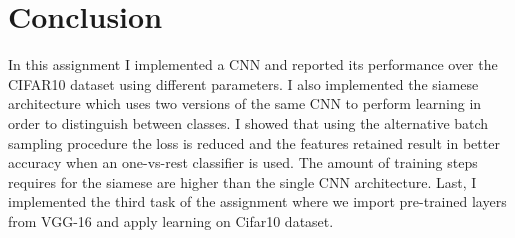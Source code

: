 \documentclass{article}
\begin{document}
 

\section{Conclusion}

In this assignment I implemented a CNN and reported its performance over the CIFAR10 dataset using different parameters.
I also implemented the siamese architecture which uses two versions of the same CNN to perform learning in order to distinguish between classes.
I showed that using the alternative batch sampling procedure the loss is reduced and the features retained result in better accuracy when an one-vs-rest classifier is used.
The amount of training steps requires for the siamese are higher than the single CNN architecture.
Last, I implemented the third task of the assignment where we import pre-trained layers from VGG-16 and apply learning on Cifar10 dataset.
\end{document}
